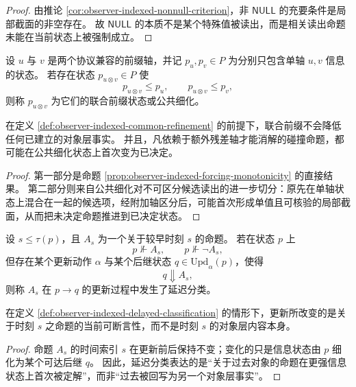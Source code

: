 \begin{proof}
由推论 \ref{cor:observer-indexed-nonnull-criterion}，非 \(\mathsf{NULL}\) 的充要条件是局部截面的非空存在。
故 \(\mathsf{NULL}\) 的本质不是某个特殊值被读出，而是相关读出命题未能在当前状态上被强制成立。
\end{proof}

\begin{definition}[多轴前缀与公共细化]\label{def:observer-indexed-common-refinement}
设 \(u\) 与 \(v\) 是两个协议兼容的前缀轴，并记 \(p_u,p_v\in P\) 为分别只包含单轴 \(u,v\) 信息的状态。
若存在状态 \(p_{u\otimes v}\in P\) 使
\[
p_{u\otimes v}\le p_u,
\qquad
p_{u\otimes v}\le p_v,
\]
则称 \(p_{u\otimes v}\) 为它们的联合前缀状态或公共细化。
\end{definition}

\begin{proposition}[多轴前缀提升可断言性]\label{prop:observer-indexed-common-refinement-decidability}
在定义 \ref{def:observer-indexed-common-refinement} 的前提下，联合前缀不会降低任何已建立的对象层事实。
并且，凡依赖于额外残差轴才能消解的碰撞命题，都可能在公共细化状态上首次变为已决定。
\end{proposition}

\begin{proof}
第一部分是命题 \ref{prop:observer-indexed-forcing-monotonicity} 的直接结果。
第二部分则来自公共细化对不可区分候选读出的进一步切分：原先在单轴状态上混合在一起的候选项，经附加轴区分后，可能首次形成单值且可核验的局部截面，从而把未决定命题推进到已决定状态。
\end{proof}

\begin{definition}[延迟分类]\label{def:observer-indexed-delayed-classification}
设 \(s\le \tau(p)\)，且 \(A_s\) 为一个关于较早时刻 \(s\) 的命题。
若在状态 \(p\) 上
\[
p\nVdash A_s,
\qquad
p\nVdash \neg A_s,
\]
但存在某个更新动作 \(\alpha\) 与某个后继状态 \(q\in \mathrm{Upd}_\alpha(p)\)，使得
\[
q\Downarrow A_s,
\]
则称 \(A_s\) 在 \(p\to q\) 的更新过程中发生了延迟分类。
\end{definition}

\begin{proposition}[延迟分类不改写过去]\label{prop:observer-indexed-delayed-classification-not-retrocausal}
在定义 \ref{def:observer-indexed-delayed-classification} 的情形下，更新所改变的是关于时刻 \(s\) 之命题的当前可断言性，而不是时刻 \(s\) 的对象层内容本身。
\end{proposition}

\begin{proof}
命题 \(A_s\) 的时间索引 \(s\) 在更新前后保持不变；变化的只是信息状态由 \(p\) 细化为某个可达后继 \(q\)。
因此，延迟分类表达的是“关于过去对象的命题在更强信息状态上首次被定解”，而非“过去被回写为另一个对象层事实”。
\end{proof}

